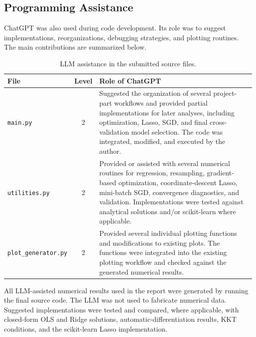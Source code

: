 \documentclass[aps,rmp,reprint,amsmath,amssymb,graphicx,longbibliography]{revtex4-1}
\begin{document}
\subsection{Programming Assistance}

ChatGPT was also used during code development. Its role was to suggest
implementations, reorganizations, debugging strategies, and plotting routines.
The main contributions are summarized below.

\begin{table}[t]
\centering
\caption{LLM assistance in the submitted source files.}
\begin{tabular}{p{}cp{}}
\hline
File & Level & Role of ChatGPT \\
\hline
\texttt{main.py} & 2 &
Suggested the organization of several project-part workflows and provided partial implementations for later analyses, including
optimization, Lasso, SGD, and final cross-validation model selection.
The code was integrated, modified, and executed by the author. \\

\texttt{utilities.py} & 2 &
Provided or assisted with several numerical routines for regression,
resampling, gradient-based optimization, coordinate-descent Lasso,
mini-batch SGD, convergence diagnostics, and validation. Implementations were
tested against analytical solutions and/or scikit-learn where applicable. \\

\texttt{plot\_generator.py} & 2 &
Provided several individual plotting functions and modifications to existing
plots. The functions were integrated into the existing plotting workflow and
checked against the generated numerical results. \\
\hline
\end{tabular}
\end{table}

All LLM-assisted numerical results used in the report were generated by
running the final source code. The LLM was not used to fabricate numerical
data. Suggested implementations were tested and compared, where applicable,
with closed-form OLS and Ridge solutions, automatic-differentiation results,
KKT conditions, and the scikit-learn Lasso implementation.

\newpage




\end{document}

